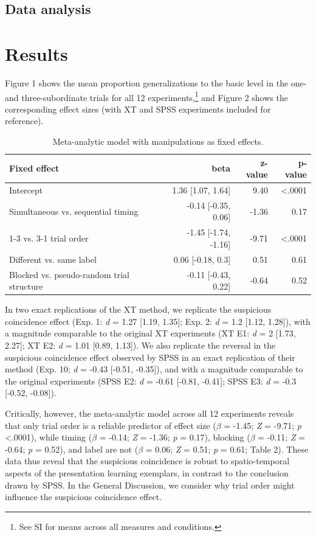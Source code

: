 \documentclass[english,floatsintext,man]{apa6}
\theoremstyle{definition}
\theoremstyle{definition}
\theoremstyle{remark}
\begin{document}
\subsection{Data analysis}\label{data-analysis}

\section{Results}\label{results}

Figure 1 shows the mean proportion generalizations to the basic level in
the one- and three-subordinate trials for all 12
experiments,\footnote{See SI for means across all measures and conditions.}
and Figure 2 shows the corresponding effect sizes (with XT and SPSS
experiments included for reference).

\begin{table}

\caption{\label{tab:unnamed-chunk-5}Meta-analytic model with manipulations as fixed effects.}
\centering
\fontsize{12}{14}\selectfont
\begin{tabular}[t]{lrrr}
\toprule
Fixed effect & beta & z-value & p-value\\
\midrule
Intercept & 1.36 [1.07, 1.64] & 9.40 & <.0001\\
Simultaneous vs. sequential timing & -0.14 [-0.35, 0.06] & -1.36 & 0.17\\
1-3 vs. 3-1 trial order & -1.45 [-1.74, -1.16] & -9.71 & <.0001\\
Different vs. same label & 0.06 [-0.18, 0.3] & 0.51 & 0.61\\
Blocked vs. pseudo-random trial structure & -0.11 [-0.43, 0.22] & -0.64 & 0.52\\
\bottomrule
\end{tabular}
\end{table}

In two exact replications of the XT method, we replicate the suspicious
coincidence effect (Exp. 1: \emph{d} = 1.27 {[}1.19, 1.35{]}; Exp. 2:
\emph{d} = 1.2 {[}1.12, 1.28{]}), with a magnitude comparable to the
original XT experiments (XT E1: \emph{d} = 2 {[}1.73, 2.27{]}; XT E2:
\emph{d} = 1.01 {[}0.89, 1.13{]}). We also replicate the reversal in the
suspicious coincidence effect observed by SPSS in an exact replication
of their method (Exp. 10; \emph{d} = -0.43 {[}-0.51, -0.35{]}), and with
a magnitude comparable to the original experiments (SPSS E2: \emph{d} =
-0.61 {[}-0.81, -0.41{]}; SPSS E3: \emph{d} = -0.3 {[}-0.52, -0.08{]}).

Critically, however, the meta-analytic model across all 12 experiments
reveals that only trial order is a reliable predictor of effect size
(\(\beta\) = -1.45; \emph{Z} = -9.71; \emph{p} \textless{}.0001), while
timing (\(\beta\) = -0.14; \emph{Z} = -1.36; \emph{p} = 0.17), blocking
(\(\beta\) = -0.11; \emph{Z} = -0.64; \emph{p} = 0.52), and label are
not (\(\beta\) = 0.06; \emph{Z} = 0.51; \emph{p} = 0.61; Table 2). These
data thus reveal that the suspicious coincidence is robust to
spatio-temporal aspects of the presentation learning exemplars, in
contrast to the conclusion drawn by SPSS. In the General Discussion, we
consider why trial order might influence the suspicious coincidence
effect.
\end{document}
